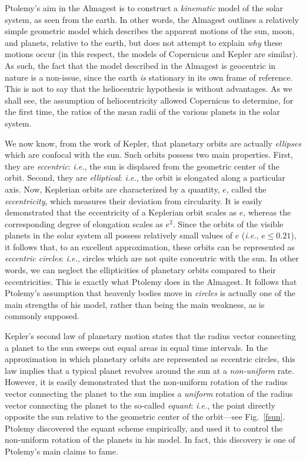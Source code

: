  Ptolemy's aim in the Almagest is to construct a {\em kinematic}\/ model of
  the solar system, as seen from the earth. In other words, the Almagest outlines a relatively simple geometric model  which describes
 the apparent motions of the sun, moon, and planets, relative to the earth, but does not attempt to explain
 {\em why}\/ these motions occur (in this respect, the models of Copernicus and Kepler are similar).  As such, the fact that the model described
 in the Almagest is geocentric in nature is a non-issue, since the earth {\em is}\/ stationary in its own frame of reference. This is not to say that the
 heliocentric hypothesis is without advantages. As we shall see, the
 assumption of heliocentricity allowed Copernicus to determine, for the first time, the ratios
 of the mean radii of the various planets in the solar system.
 
 We now know, from the work of Kepler, that  planetary orbits are actually {\em ellipses}\/
 which are confocal with the sun. Such orbits possess two  main properties.
 First, they are {\em eccentric}: {\em i.e.}, the sun is displaced from the
 geometric center of the orbit. Second, they are {\em elliptical}: {\em i.e.},
  the orbit is elongated along a particular axis. Now, Keplerian orbits are  characterized by a quantity, $e$, called the {\em eccentricity}, which
 measures their deviation from circularity. It is easily demonstrated
 that the eccentricity of a Keplerian 
 orbit scales as $e$, whereas the corresponding degree of elongation
 scales as $e^2$. Since the orbits of the visible planets in the solar system all possess relatively small values of $e$ ({\em i.e.}, $e\leq 0.21$), it follows that, to an excellent approximation, these orbits can be represented as {\em eccentric circles}: {\em i.e.},
 circles which are not quite concentric with the sun. In other words,
 we can neglect the ellipticities of planetary orbits compared to
 their eccentricities.
 This is exactly
 what Ptolemy does in the Almagest.
 It follows that Ptolemy's
 assumption that heavenly bodies move in {\em circles}\/ is actually
 one of the main strengths of his model, rather than 
 being the main weakness, as is commonly
 supposed.
 
 Kepler's second law of planetary motion states that the radius
 vector connecting a planet to the sun sweeps out equal areas in equal
 time intervals. In the approximation in which planetary orbits
 are represented as eccentric circles, this law implies that a typical planet
 revolves around the sun at a {\em non-uniform}\/ rate. However,
 it is easily demonstrated  that the non-uniform rotation of the radius vector connecting the planet to the sun  implies a {\em uniform}\/ rotation of the radius vector connecting the
 planet to the so-called {\em equant}: {\em i.e.}, the point directly opposite the sun
 relative to the geometric center of the orbit---see Fig.~\ref{fsun}. 
 Ptolemy discovered the equant scheme empirically, and used it
 to control the non-uniform rotation of the planets in his model.
In fact,  this discovery is one of Ptolemy's main claims to fame.
 
